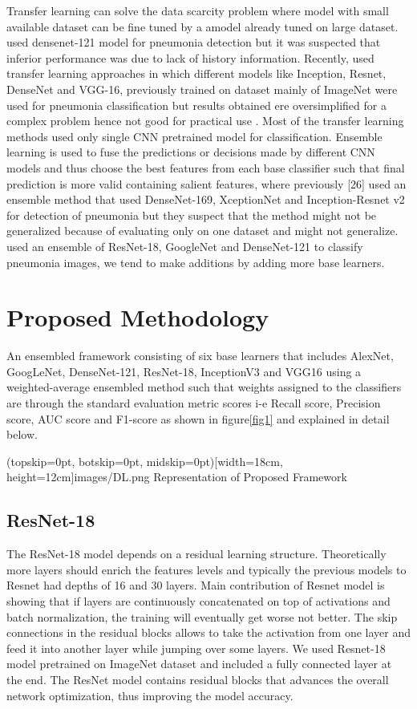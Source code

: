 \documentclass{ieeeaccess}
\begin{document}
Transfer learning can solve the data scarcity problem where model with small available dataset can be fine tuned by a amodel already tuned on large dataset.\cite{b14} used densenet-121 model for pneumonia detection but it was suspected that inferior performance was due to lack of history information. Recently, \cite{b7,b8,b9,b11} used transfer learning approaches in which different models like Inception, Resnet, DenseNet and VGG-16, previously trained on dataset mainly of ImageNet were used for pneumonia classification but results obtained ere oversimplified for a complex problem hence not good for practical use \cite{b10}. Most of the transfer learning methods used only single CNN pretrained model for classification. Ensemble learning \cite{b31, b32} is used to fuse the predictions or decisions made by different CNN models and thus choose the best features from each base classifier such that final prediction is more valid containing salient features, where previously [26] used an ensemble method that used DenseNet-169, XceptionNet and Inception-Resnet v2 for detection of pneumonia but they suspect that the method might not be generalized because of evaluating only on one dataset and might not generalize. \cite{b33} used an ensemble of ResNet-18, GoogleNet and DenseNet-121 to classify pneumonia images, we tend to make additions by adding more base learners.

\section{Proposed Methodology}
An ensembled framework consisting of six base learners that includes AlexNet, GoogLeNet, DenseNet-121, ResNet-18, InceptionV3 and VGG16 using a weighted-average ensembled method such that weights assigned to the classifiers are through the standard evaluation metric scores i-e Recall score, Precision score, AUC score and F1-score as shown in figure\ref{fig1} and explained in detail below.

\Figure[t!](topskip=0pt, botskip=0pt, midskip=0pt)[width=18cm, height=12cm]{images/DL.png} {Representation of Proposed Framework}\label{fig:fig1}

\subsection{ResNet-18}
The ResNet-18 model depends on a residual learning structure. Theoretically more layers should enrich the features levels and typically the previous models to Resnet had depths of 16 and 30 layers. Main contribution of Resnet model is showing that if layers are continuously concatenated on top of activations and batch normalization, the training will eventually get worse not better. The skip connections in the residual blocks allows to take the activation from one layer and feed it into another layer while jumping over some layers. We used Resnet-18 model pretrained on ImageNet dataset and included a fully connected layer at the end. The ResNet model contains residual blocks that advances the overall network optimization, thus improving the model accuracy.
\end{document}
